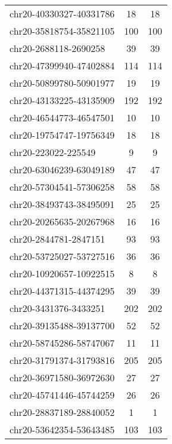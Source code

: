 \begin{longtable}{lSS}
	chr20-40330327-40331786 & 18     & 18                         \\
	chr20-35818754-35821105 & 100    & 100                        \\
	chr20-2688118-2690258   & 39     & 39                         \\
	chr20-47399940-47402884 & 114    & 114                        \\
	chr20-50899780-50901977 & 19     & 19                         \\
	chr20-43133225-43135909 & 192    & 192                        \\
	chr20-46544773-46547501 & 10     & 10                         \\
	chr20-19754747-19756349 & 18     & 18                         \\
	chr20-223022-225549     & 9      & 9                          \\
	chr20-63046239-63049189 & 47     & 47                         \\
	chr20-57304541-57306258 & 58     & 58                         \\
	chr20-38493743-38495091 & 25     & 25                         \\
	chr20-20265635-20267968 & 16     & 16                         \\
	chr20-2844781-2847151   & 93     & 93                         \\
	chr20-53725027-53727516 & 36     & 36                         \\
	chr20-10920657-10922515 & 8      & 8                          \\
	chr20-44371315-44374295 & 39     & 39                         \\
	chr20-3431376-3433251   & 202    & 202                        \\
	chr20-39135488-39137700 & 52     & 52                         \\
	chr20-58745286-58747067 & 11     & 11                         \\
	chr20-31791374-31793816 & 205    & 205                        \\
	chr20-36971580-36972630 & 27     & 27                         \\
	chr20-45741446-45744259 & 26     & 26                         \\
	chr20-28837189-28840052 & 1      & 1                          \\
	chr20-53642354-53643485 & 103    & 103                        \\

\end{longtable}
